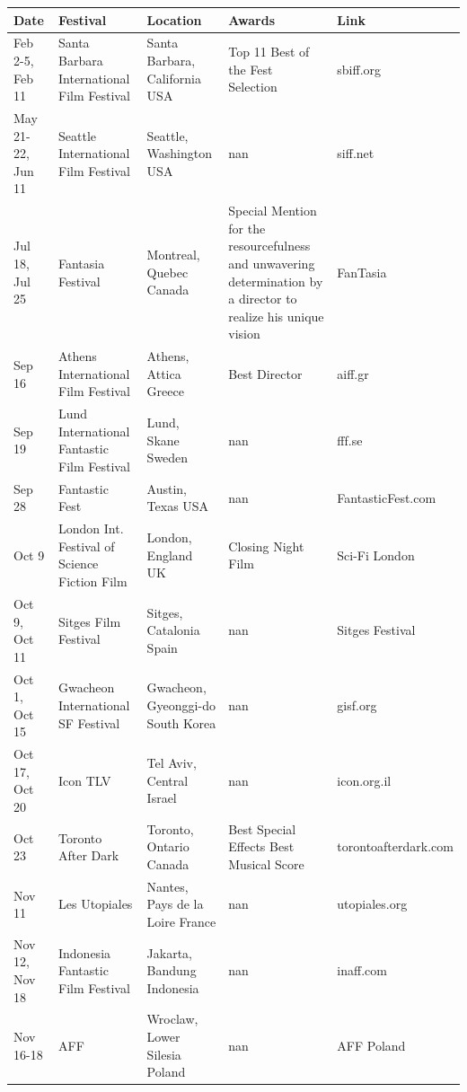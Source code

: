 \documentclass{article}
\begin{document}
\begin{tabular}{lllll}
\toprule
Date & Festival & Location & Awards & Link \\
\midrule
Feb 2-5, Feb 11 & Santa Barbara International Film Festival & Santa Barbara, California  USA & Top 11 Best of the Fest Selection & sbiff.org \\
May 21-22, Jun 11 & Seattle International Film Festival & Seattle, Washington  USA & nan & siff.net \\
Jul 18, Jul 25 & Fantasia Festival & Montreal, Quebec  Canada & Special Mention for the resourcefulness and unwavering determination by a director to realize his unique vision & FanTasia \\
Sep 16 & Athens International Film Festival & Athens, Attica  Greece & Best Director & aiff.gr \\
Sep 19 & Lund International Fantastic Film Festival & Lund, Skane  Sweden & nan & fff.se \\
Sep 28 & Fantastic Fest & Austin, Texas  USA & nan & FantasticFest.com \\
Oct 9 & London Int. Festival of Science Fiction Film & London, England  UK & Closing Night Film & Sci-Fi London \\
Oct 9, Oct 11 & Sitges Film Festival & Sitges, Catalonia  Spain & nan & Sitges Festival \\
Oct 1, Oct 15 & Gwacheon International SF Festival & Gwacheon, Gyeonggi-do  South Korea & nan & gisf.org \\
Oct 17, Oct 20 & Icon TLV & Tel Aviv, Central  Israel & nan & icon.org.il \\
Oct 23 & Toronto After Dark & Toronto, Ontario  Canada & Best Special Effects Best Musical Score & torontoafterdark.com \\
Nov 11 & Les Utopiales & Nantes, Pays de la Loire  France & nan & utopiales.org \\
Nov 12, Nov 18 & Indonesia Fantastic Film Festival & Jakarta, Bandung  Indonesia & nan & inaff.com \\
Nov 16-18 & AFF & Wroclaw, Lower Silesia  Poland & nan & AFF Poland \\
\bottomrule
\end{tabular}
\end{document}
